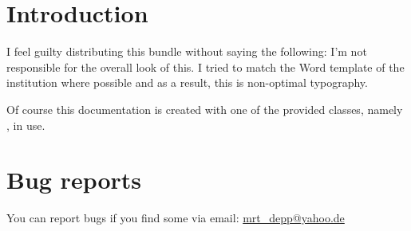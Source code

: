 \documentclass[oneside,UKenglish]{MRTthesis}
\begin{document}
\tableofcontents
\mainpart
\chapter{Introduction}
I feel guilty distributing this bundle without saying the following: I'm not
responsible for the overall look of this. I tried to match the Word template of
the institution where possible and as a result, this is non-optimal typography.

Of course this documentation is created with one of the provided classes, namely
, in use.






\chapter{Bug reports}\label{sec:bugs}
You can report bugs if you find some via email:
\href{mailto:mrt_depp@yahoo.de?subject=MRTbundle -- bug report}
  {mrt\_depp@yahoo.de}
\end{document}
